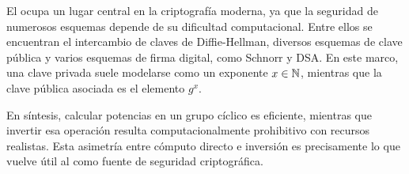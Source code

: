 El \DLP ocupa un lugar central en la criptografía moderna, ya que la seguridad de numerosos esquemas depende de su dificultad computacional. Entre ellos se encuentran el intercambio de claves de Diffie-Hellman, diversos esquemas de clave pública y varios esquemas de firma digital, como Schnorr y DSA. En este marco, una clave privada suele modelarse como un exponente $x \in \mathbb{N}$, mientras que la clave pública asociada es el elemento $g^x$.

En síntesis, calcular potencias en un grupo cíclico es eficiente, mientras que invertir esa operación resulta computacionalmente prohibitivo con recursos realistas. Esta asimetría entre cómputo directo e inversión es precisamente lo que vuelve útil al \DLP como fuente de seguridad criptográfica.
